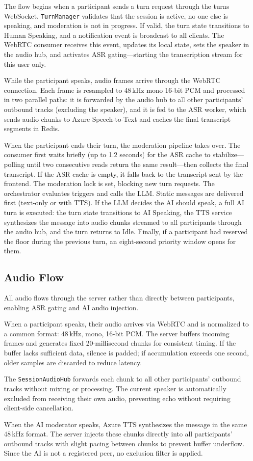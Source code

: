 The flow begins when a participant sends a turn request through the turns WebSocket. \texttt{TurnManager} validates that the session is active, no one else is speaking, and moderation is not in progress. If valid, the turn state transitions to Human Speaking, and a notification event is broadcast to all clients. The WebRTC consumer receives this event, updates its local state, sets the speaker in the audio hub, and activates ASR gating---starting the transcription stream for this user only.

While the participant speaks, audio frames arrive through the WebRTC connection. Each frame is resampled to 48\,kHz mono 16-bit PCM and processed in two parallel paths: it is forwarded by the audio hub to all other participants' outbound tracks (excluding the speaker), and it is fed to the ASR worker, which sends audio chunks to Azure Speech-to-Text and caches the final transcript segments in Redis.

When the participant ends their turn, the moderation pipeline takes over. The consumer first waits briefly (up to 1.2 seconds) for the ASR cache to stabilize---polling until two consecutive reads return the same result---then collects the final transcript. If the ASR cache is empty, it falls back to the transcript sent by the frontend. The moderation lock is set, blocking new turn requests. The orchestrator evaluates triggers and calls the LLM. Static messages are delivered first (text-only or with TTS). If the LLM decides the AI should speak, a full AI turn is executed: the turn state transitions to AI Speaking, the TTS service synthesizes the message into audio chunks streamed to all participants through the audio hub, and the turn returns to Idle. Finally, if a participant had reserved the floor during the previous turn, an eight-second priority window opens for them.



\subsection{Audio Flow}

All audio flows through the server rather than directly between participants, enabling ASR gating and AI audio injection.

When a participant speaks, their audio arrives via WebRTC and is normalized to a common format: 48\,kHz, mono, 16-bit PCM. The server buffers incoming frames and generates fixed 20-millisecond chunks for consistent timing. If the buffer lacks sufficient data, silence is padded; if accumulation exceeds one second, older samples are discarded to reduce latency.

The \texttt{SessionAudioHub} forwards each chunk to all other participants' outbound tracks without mixing or processing. The current speaker is automatically excluded from receiving their own audio, preventing echo without requiring client-side cancellation.

When the AI moderator speaks, Azure TTS synthesizes the message in the same 48\,kHz format. The server injects these chunks directly into all participants' outbound tracks with slight pacing between chunks to prevent buffer underflow. Since the AI is not a registered peer, no exclusion filter is applied.
